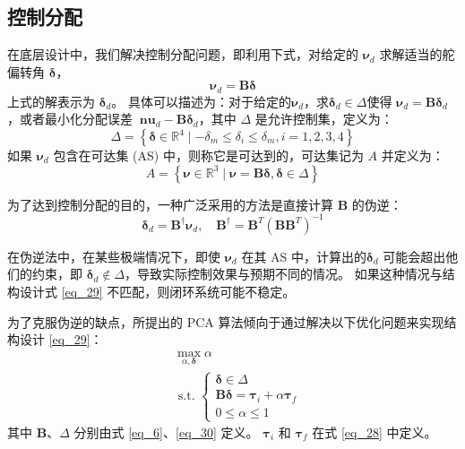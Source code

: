\subsection{控制分配}
在底层设计中，我们解决控制分配问题，即利用下式，对给定的 ${{\boldsymbol{\nu }}_{d}}$ 求解适当的舵偏转角 $\boldsymbol{\delta }$，
\begin{equation}
	{\boldsymbol {\nu}_d}={\boldsymbol{B\delta}}
	\label{eq_29.5}
\end{equation}
上式的解表示为 $\boldsymbol{\delta }_d$。 具体可以描述为：对于给定的${{\boldsymbol{\nu }}_{d}}$，求${{\boldsymbol{\delta }}_{d}}\in \Delta $使得 ${{\boldsymbol{\nu }}_{d}}=\boldsymbol{B}{{\boldsymbol{\delta }}_{d}}$，或者最小化分配误差 ${{\boldsymbol{\ nu }}_{d}}-\boldsymbol{B}{{\boldsymbol{\delta }}_{d}}$，其中 $\Delta $ 是允许控制集，定义为：
\begin{equation}
	\Delta=\left\{\boldsymbol{\delta} \in \mathbb{R}^{4} \mid-\delta_{m} \leq \delta_{i} \leq \delta_{m}, i=1,2,3,4\right\}
	\label{eq_30}
\end{equation}
如果 ${{\boldsymbol{\nu }}_{d}}$ 包含在可达集 (AS) 中，则称它是可达到的，可达集记为 $A$ 并定义为：
\begin{equation}
	A=\left\{\boldsymbol{\nu} \in \mathbb{R}^{3} \mid \boldsymbol{\nu}=\boldsymbol{B} \boldsymbol{\delta}, \boldsymbol{\delta} \in \Delta\right\}
	\label{eq_31}
\end{equation}

为了达到控制分配的目的，一种广泛采用的方法是直接计算 $\boldsymbol{B}$ 的伪逆：
\begin{equation}
	{{\boldsymbol{\delta }}_d} = {{\boldsymbol{B}}^\dag }{{\boldsymbol{\nu }}_d},   \quad  {{\boldsymbol{B}}^\dag } = {{\boldsymbol{B}}^T}{\left( {{\boldsymbol{B}}{{\boldsymbol{B}}^T}} \right)^{ - 1}}
	\label{eq_32}
\end{equation}

在伪逆法中，在某些极端情况下，即使 ${{\boldsymbol{\nu }}_{d}}$ 在其 AS 中，计算出的${{\boldsymbol{\delta }}_{d}}$ 可能会超出他们的约束，即 ${{\boldsymbol{\delta }}_{d}}\notin \Delta $，导致实际控制效果与预期不同的情况。 如果这种情况与结构设计式 \eqref{eq_29} 不匹配，则闭环系统可能不稳定。

为了克服伪逆的缺点，所提出的 PCA 算法倾向于通过解决以下优化问题来实现结构设计 \eqref{eq_29}：
\begin{equation}
	\begin{aligned}
	&\max _{\alpha, \boldsymbol{\delta}} \alpha\\
	&\text { s.t. }\left\{\begin{array}{l}
	\boldsymbol{\delta} \in \Delta \\
	\boldsymbol{B} \boldsymbol{\delta}=\boldsymbol{\tau}_{i}+\alpha \boldsymbol{\tau}_{f} \\
	0 \leq \alpha \leq 1
	\end{array}\right.
	\end{aligned}
	\label{eq_pca}
\end{equation}
其中 $ \boldsymbol{B} $、$ \Delta $ 分别由式 \eqref{eq_6}、\eqref{eq_30} 定义。 $ \boldsymbol{\tau}_{i} $ 和 $ \boldsymbol{\tau}_{f} $ 在式 \eqref{eq_28} 中定义。



